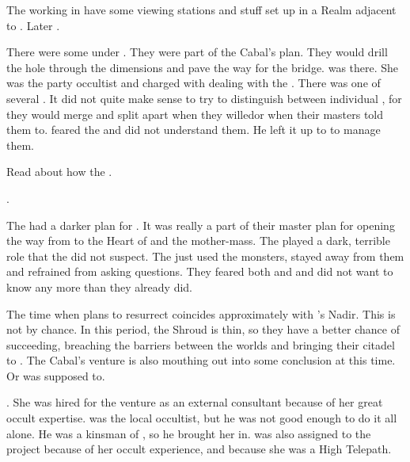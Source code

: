 The \resphain working in \Malcur have some viewing stations and stuff set up in a Realm adjacent to \Azmith. 
Later . 

There were some \noggyaleth under \Malcur.
They were part of the Cabal's plan.
They would drill the hole through the dimensions and pave the way for the bridge.
\Urizeth was there.
She was the party occultist and charged with dealing with the \noggyaleth.
There was one of several \noggyaleth.
It did not quite make sense to try to distinguish between individual \noggyaleth, for they would merge and split apart when they willed\dash{}or when their masters told them to.
\Teshrial feared the \noggyaleth and did not understand them.
He left it up to \Urizeth to manage them.

Read about how the \noggyaleth {}. 

\Teshrial {}. 

The \banes had a darker plan for \Malcur.
It was really a part of their master plan for opening the way from \Erebos to the Heart of \Miith and the \noggyal mother-mass.
The \noggyaleth played a dark, terrible role that the \resphain did not suspect.
The \resphain just used the monsters, stayed away from them and refrained from asking questions.
They feared both \noggyaleth and \banes and did not want to know any more than they already did.

The time when \Secherdamon plans to resurrect \Nithdornazsh coincides approximately with \Ishnaruchaefir's Nadir.
This is not by chance. 
In this period, the Shroud is thin, so they have a better chance of succeeding, breaching the barriers between the worlds and bringing their citadel to \Azmith. 
The Cabal's \Malcur venture is also mouthing out into some conclusion at this time. 
Or was supposed to. 

. 
She was hired for the \Malcur venture as an external consultant because of her great occult expertise. 
\Ganethed was the local occultist, but he was not good enough to do it all alone. 
He was a kinsman of \Urizeth, so he brought her in. 
\Achsah was also assigned to the project because of her occult experience, and because she was a High Telepath. 






